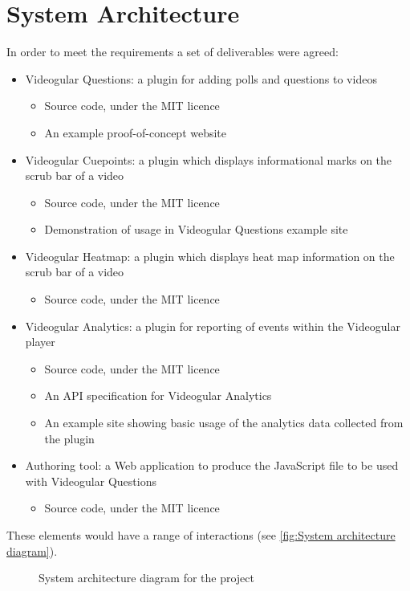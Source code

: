 \section{System Architecture}
In order to meet the requirements a set of deliverables were agreed:
\begin{itemize}
\item Videogular Questions: a plugin for adding polls and questions to videos
\begin{itemize}
\item Source code, under the MIT licence
\item An example proof-of-concept website
\end{itemize}
\item Videogular Cuepoints: a plugin which displays informational marks on the scrub bar of a video
\begin{itemize}
\item Source code, under the MIT licence
\item Demonstration of usage in Videogular Questions example site
\end{itemize}
\item Videogular Heatmap: a plugin which displays heat map information on the scrub bar of a video
\begin{itemize}
\item Source code, under the MIT licence
\end{itemize}
\item Videogular Analytics: a plugin for reporting of events within the Videogular player
\begin{itemize}
\item Source code, under the MIT licence
\item An API speciﬁcation for Videogular Analytics
\item An example site showing basic usage of the analytics data collected from the plugin
\end{itemize}
\item Authoring tool: a Web application to produce the JavaScript ﬁle to be used with Videogular Questions
\begin{itemize}
\item Source code, under the MIT licence
\end{itemize}
\end{itemize}

These elements would have a range of interactions (see \autoref{fig:System architecture diagram}).

\begin{figure}[h!]
\centering

\caption{System architecture diagram for the project \label{fig:System architecture diagram}}
\end{figure}


